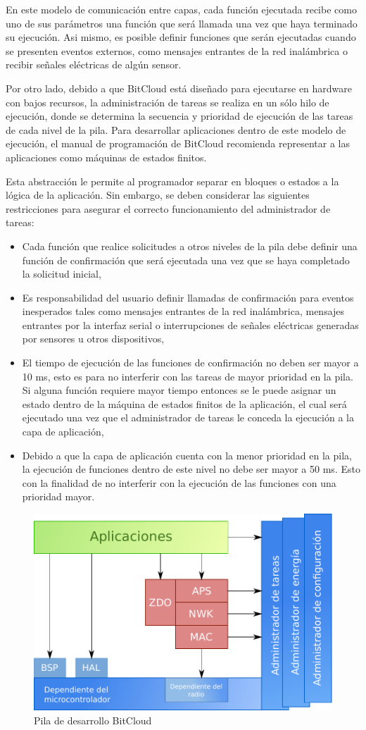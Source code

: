 En este modelo de comunicación entre capas, cada función ejecutada recibe como uno de sus parámetros una función que será llamada una vez que haya terminado su ejecución. Asi mismo, es posible definir funciones que serán ejecutadas cuando se presenten eventos externos, como mensajes entrantes de la red inalámbrica o recibir señales eléctricas de algún sensor.   

Por otro lado, debido a que BitCloud está diseñado para ejecutarse en hardware con bajos recursos, la administración de tareas se realiza en un sólo hilo de ejecución, donde se determina la secuencia y prioridad de ejecución de las tareas de cada nivel de la pila. Para desarrollar aplicaciones dentro de este modelo de ejecución, el manual de programación de BitCloud recomienda representar a las aplicaciones como máquinas de estados finitos. 

Esta abstracción le permite al programador separar en bloques o estados a la lógica de la aplicación. Sin embargo, se deben considerar las siguientes restricciones para asegurar el correcto funcionamiento del administrador de tareas: 

\begin{itemize}
	\item Cada función que realice solicitudes a otros niveles de la pila debe definir una función de confirmación que será ejecutada una vez que se haya completado la solicitud inicial, 
	\item Es responsabilidad del usuario definir llamadas de confirmación para eventos inesperados tales como mensajes entrantes de la red inalámbrica, mensajes entrantes por la interfaz serial o interrupciones de señales eléctricas generadas por sensores u otros dispositivos,  
	\item El tiempo de ejecución de las funciones de confirmación no deben ser mayor a 10 ms, esto es para no interferir con las tareas de mayor prioridad en la pila. Si alguna función requiere mayor tiempo entonces se le puede asignar un estado dentro de la máquina de estados finitos de la aplicación, el cual será ejecutado una vez que el administrador de tareas le conceda la ejecución a la capa de aplicación, 
	\item Debido a que la capa de aplicación cuenta con la menor prioridad en la pila, la ejecución de funciones dentro de este nivel no debe ser mayor a 50 ms. Esto con la finalidad de no interferir con la ejecución de las funciones con una prioridad mayor. 
\end{itemize}


\begin{figure}
	\centering 
	\includegraphics[scale=0.45]{capitulo_2_imgs/pila_bitcloud.pdf}
	\caption{Pila de desarrollo BitCloud}
	\label{fig:bitcloud}
\end{figure}